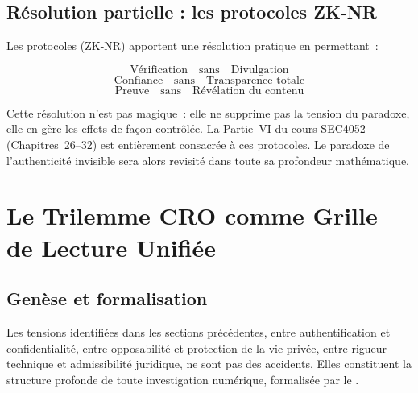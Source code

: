 \subsection{Résolution partielle : les protocoles ZK-NR}

Les protocoles  (ZK-NR)
\cite{minka2025zknr} apportent une résolution pratique en permettant~:

\[
\text{Vérification} \quad \text{sans} \quad \text{Divulgation}
\]
\[
\text{Confiance} \quad \text{sans} \quad \text{Transparence totale}
\]
\[
\text{Preuve} \quad \text{sans} \quad \text{Révélation du contenu}
\]

Cette résolution n'est pas magique~: elle ne supprime pas la tension
du paradoxe, elle en gère les effets de façon contrôlée. La Partie~VI
du cours SEC4052 (Chapitres~26--32) est entièrement consacrée à ces protocoles.
Le paradoxe de l'authenticité invisible sera alors revisité dans toute
sa profondeur mathématique.

\section{Le Trilemme CRO comme Grille de Lecture Unifiée}

\subsection{Genèse et formalisation}

Les tensions identifiées dans les sections précédentes, entre
authentification et confidentialité, entre opposabilité et protection de
la vie privée, entre rigueur technique et admissibilité juridique, ne
sont pas des accidents. Elles constituent la structure profonde de toute
investigation numérique, formalisée par le 
\cite{minka2025cro}.

